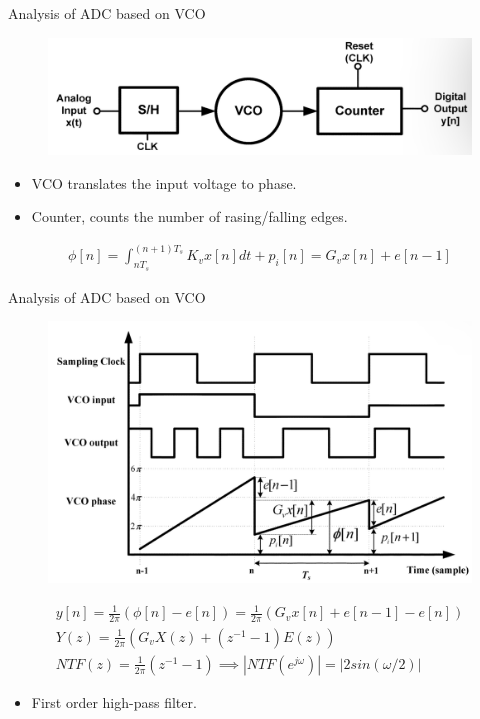 \documentclass{beamer}
\begin{document}
\begin{frame}{Analysis of ADC based on VCO}
\begin{figure}
	\includegraphics[scale=0.3]{./figs/Vco .png}
\end{figure}
\pause
\begin{itemize}
	\item VCO translates the input voltage to phase.
	\pause
	\item Counter, counts the number of rasing/falling edges.
\end{itemize}
\begin{gather*}
	\phi [n] = \int_{nT_s}^{(n+1)T_s}K_vx[n]dt + p_i[n] = G_vx[n] + e[n-1]
\end{gather*}
\end{frame}

\begin{frame}{Analysis of ADC based on VCO}
\begin{figure}
	\includegraphics[scale=0.25]{./figs/Vcoplot.png}
\end{figure}
\vspace{-0.9cm}
\pause
\begin{gather*}
	y[n] = \frac{1}{2\pi}(\phi [n] - e[n]) = \frac{1}{2\pi}(G_vx[n] + e[n-1] - e[n])\\
	Y(z) = \frac{1}{2\pi}(G_vX(z) + (z^{-1} - 1)E(z))\\
	NTF(z) = \frac{1}{2\pi}(z^{-1} - 1) \implies |NTF(e^{j\omega})| = |2sin(\omega /2)|
\end{gather*}
\pause
\vspace{-1cm}
\begin{itemize}
	\item First order high-pass filter.
\end{itemize}
\end{frame}
\end{document}
